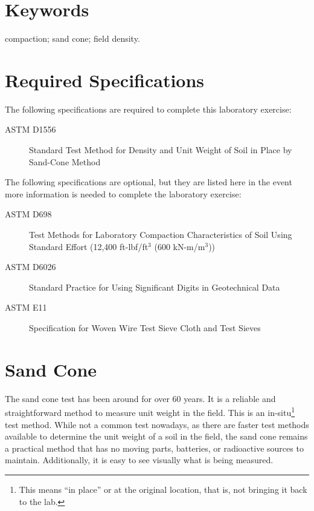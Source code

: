\documentclass[12pt]{article}
\begin{document}
\vfill
\section*{Keywords}
\normalsize compaction; sand cone; field density.\\
\pagebreak
\begin{center}
\tableofcontents
\pagebreak
\listoftables
\listoffigures
\end{center}
\pagebreak
\section*{Required Specifications}
The following specifications are required to complete this laboratory exercise:
\begin{description}
\item[ASTM D1556] Standard Test Method for Density and Unit Weight of Soil in Place by Sand-Cone Method
\end{description}

The following specifications are optional, but they are listed here in the event more information is needed to complete the laboratory exercise:
\begin{description}
\item[ASTM D698] Test Methods for Laboratory Compaction Characteristics of Soil Using Standard Effort (12,400 ft-lbf/ft$^3$ (600 kN-m/m$^3$))
\item[ASTM D6026] Standard Practice for Using Significant Digits in Geotechnical Data
\item[ASTM E11] Specification for Woven Wire Test Sieve Cloth and Test Sieves
\end{description}
\pagebreak
\section{Sand Cone}
\label{sec:intro}
\normalsize 
The sand cone test has been around for over 60 years. It is a reliable and straightforward method to measure unit weight in the field. This is an in-situ\footnote{This means ``in place'' or at the original location, that is, not bringing it back to the lab.} test method. While not a common test nowadays, as there are faster test methods available to determine the unit weight of a soil in the field, the sand cone remains a practical method that has no moving parts, batteries, or radioactive sources to maintain. Additionally, it is easy to see visually what is being measured.
\end{document}
